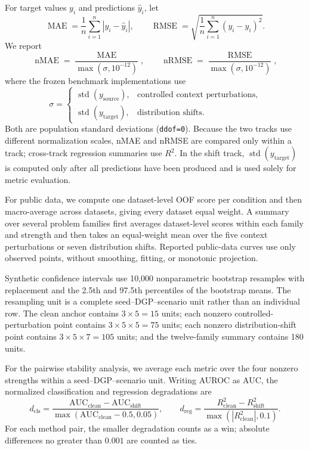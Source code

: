 For target values $y_i$ and predictions $\hat y_i$, let
\begin{equation}
  \operatorname{MAE}=\frac{1}{n}\sum_{i=1}^{n}|y_i-\hat y_i|,
  \qquad
  \operatorname{RMSE}=\sqrt{\frac{1}{n}\sum_{i=1}^{n}(y_i-\hat y_i)^2}.
\end{equation}
We report
\begin{equation}
  \operatorname{nMAE}=\frac{\operatorname{MAE}}{\max(\sigma,10^{-12})},
  \qquad
  \operatorname{nRMSE}=\frac{\operatorname{RMSE}}{\max(\sigma,10^{-12})},
\end{equation}
where the frozen benchmark implementations use
\begin{equation}
  \sigma=
  \begin{cases}
    \operatorname{std}(y_{\mathrm{source}}),
      & \text{controlled context perturbations},\\
    \operatorname{std}(y_{\mathrm{target}}),
      & \text{distribution shifts}.
  \end{cases}
\end{equation}
Both are population standard deviations (\texttt{ddof=0}).  Because the two
tracks use different normalization scales, nMAE and nRMSE are compared only
within a track; cross-track regression summaries use $R^2$.  In the shift
track, $\operatorname{std}(y_{\mathrm{target}})$ is computed only after all
predictions have been produced and is used solely for metric evaluation.

For public data, we compute one dataset-level OOF score per condition and then
macro-average across datasets, giving every dataset equal weight.  A summary
over several problem families first averages dataset-level scores within each
family and strength and then takes an equal-weight mean over the five context
perturbations or seven distribution shifts. Reported public-data curves use only
observed points, without smoothing, fitting, or monotonic projection.

Synthetic confidence intervals use 10,000 nonparametric bootstrap resamples
with replacement and the 2.5th and 97.5th percentiles of the bootstrap means.
The resampling unit is a complete seed--DGP--scenario unit rather than an
individual row.  The clean anchor contains $3\times5=15$ units; each nonzero
controlled-perturbation point contains $3\times5\times5=75$ units; each nonzero
distribution-shift point contains $3\times5\times7=105$ units; and the
twelve-family summary contains 180 units.

For the pairwise stability analysis, we average each metric over the four
nonzero strengths within a seed--DGP--scenario unit. Writing AUROC as AUC, the
normalized classification and regression degradations are
\begin{equation}
  d_{\mathrm{cls}}
  =\frac{\mathrm{AUC}_{\mathrm{clean}}-\mathrm{AUC}_{\mathrm{shift}}}
  {\max(\mathrm{AUC}_{\mathrm{clean}}-0.5,0.05)},
  \qquad
  d_{\mathrm{reg}}
  =\frac{R^2_{\mathrm{clean}}-R^2_{\mathrm{shift}}}
  {\max(|R^2_{\mathrm{clean}}|,0.1)}.
\end{equation}
For each method pair, the smaller degradation counts as a win; absolute
differences no greater than $0.001$ are counted as ties.

